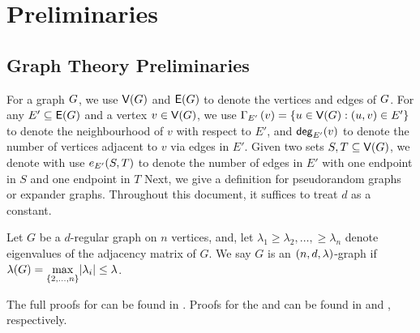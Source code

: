 \documentclass[11pt]{article}
\begin{document}
\section{Preliminaries}
\label{sec:prelims}

\subsection{Graph Theory Preliminaries}
\label{sec:graph-theory-prelims}

For a graph $\Graph$, we use $\Vertices{\Graph}$ and $\Edges{\Graph}$ to denote the vertices and edges of $\Graph$.
For any $E' \subseteq \Edges{\Graph}$ and a vertex $v \in \Vertices{\Graph}$, we use $\Neighbourhood{E'}{v} = \{ u \in \Vertices{\Graph} : (u,v) \in E' \}$ to denote the neighbourhood of $v$ with respect to $E'$, and $\degree{E'}{v}$ to denote the number of vertices adjacent to $v$ via edges in $E'$.
Given two sets $S, T \subseteq \Vertices{G}$, we denote with use $\CutEdges{S}{T}{E'}$ to denote the number of edges in $E'$ with one endpoint in $S$ and one endpoint in $T$ 
Next, we give a definition for pseudorandom graphs or expander graphs.
Throughout this document, it suffices to treat $d$ as a constant.

\begin{definition}\label{def:expander-graphs}
Let $G$ be a $d$-regular graph on $n$ vertices, and, let $\lambda_1 \geq \lambda_2, \dots, \geq \lambda_n$ denote eigenvalues of the adjacency matrix of $G$.
We say $G$ is an $\EnDeeLambda$-graph if $\ExpansionFactor{\Graph} \Def \underset{{\{2, \dots, n\}}}{\max}|\lambda_i| \leq \lambda$.
\end{definition}

The full proofs for  can be found in \citep[Theorem 2.11]{krivelevich2006pseudo}. Proofs for the  and  can be found in \citep{genmatchings2025} and \citep{tutte1954short}, respectively.
\end{document}
